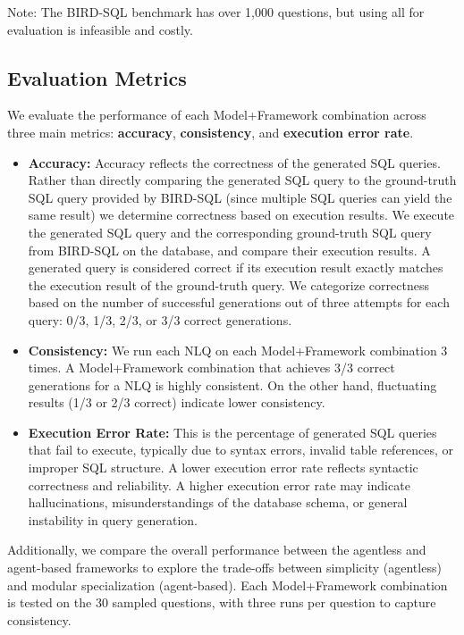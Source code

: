 \documentclass[10pt,twocolumn]{article}
\begin{document}
Note: The BIRD-SQL benchmark has over 1,000 questions, but using all for evaluation is infeasible and costly.

\subsection{Evaluation Metrics}

We evaluate the performance of each Model+Framework combination across three main metrics: \textbf{accuracy}, \textbf{consistency}, and \textbf{execution error rate}.

\begin{itemize}
    \item \textbf{Accuracy:} Accuracy reflects the correctness of the generated SQL queries. Rather than directly comparing the generated SQL query to the ground-truth SQL query provided by BIRD-SQL (since multiple SQL queries can yield the same result) we determine correctness based on execution results. We execute the generated SQL query and the corresponding ground-truth SQL query from BIRD-SQL on the database, and compare their execution results. A generated query is considered correct if its execution result exactly matches the execution result of the ground-truth query. We categorize correctness based on the number of successful generations out of three attempts for each query: 0/3, 1/3, 2/3, or 3/3 correct generations.
    \item \textbf{Consistency:} We run each NLQ on each Model+Framework combination 3 times. A Model+Framework combination that achieves 3/3 correct generations for a NLQ is highly consistent. On the other hand, fluctuating results (1/3 or 2/3 correct) indicate lower consistency.
    \item \textbf{Execution Error Rate:} This is the percentage of generated SQL queries that fail to execute, typically due to syntax errors, invalid table references, or improper SQL structure. A lower execution error rate reflects syntactic correctness and reliability. A higher execution error rate may indicate hallucinations, misunderstandings of the database schema, or general instability in query generation.
\end{itemize}

Additionally, we compare the overall performance between the agentless and agent-based frameworks to explore the trade-offs between simplicity (agentless) and modular specialization (agent-based). Each Model+Framework combination is tested on the 30 sampled questions, with three runs per question to capture consistency.
\end{document}

